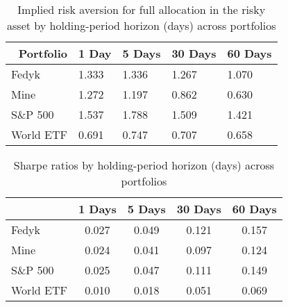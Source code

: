\begin{appendices}
\begin{table}[ht]
\centering
\caption{Implied risk aversion for full allocation in the risky asset by holding-period horizon (days) across portfolios}
\label{tab:gamma_alpha_1}
    \begin{tabular}{l|llll}
    \toprule
    \multicolumn{1}{r}{\textbf{Portfolio}} & \multicolumn{1}{r}{\textbf{1 Day}} & \multicolumn{1}{r}{\textbf{5 Days}} & \multicolumn{1}{r}{\textbf{30 Days}} & \multicolumn{1}{r}{\textbf{60 Days}} \\
    \midrule
    Fedyk                & 1.333                              & 1.336                               & 1.267                                & 1.070                                \\
    Mine                 & 1.272                              & 1.197                               & 0.862                                & 0.630                                \\
    S\&P 500             & 1.537                              & 1.788                               & 1.509                                & 1.421                                \\
    World ETF            & 0.691                              & 0.747                               & 0.707                                & 0.658                               
    \end{tabular}
\end{table}

\begin{table}[ht]
\centering
\caption{Sharpe ratios by holding-period horizon (days) across portfolios}
\label{tab:sharpe_ratio}
\begin{tabular}{l|c c c c}
    \toprule
    \multicolumn{1}{r}{} & \multicolumn{1}{r}{\textbf{1 Days}} & \multicolumn{1}{r}{\textbf{5 Days}} & \multicolumn{1}{r}{\textbf{30 Days}} & \multicolumn{1}{r}{\textbf{60 Days}} \\
    \midrule
    Fedyk                & 0.027                               & 0.049                               & 0.121                                & 0.157                                \\
    Mine                 & 0.024                               & 0.041                               & 0.097                                & 0.124                                \\
    S\&P 500             & 0.025                               & 0.047                               & 0.111                                & 0.149                                \\
    World ETF            & 0.010                               & 0.018                               & 0.051                                & 0.069                               
\end{tabular}
\end{table}





\end{appendices}
